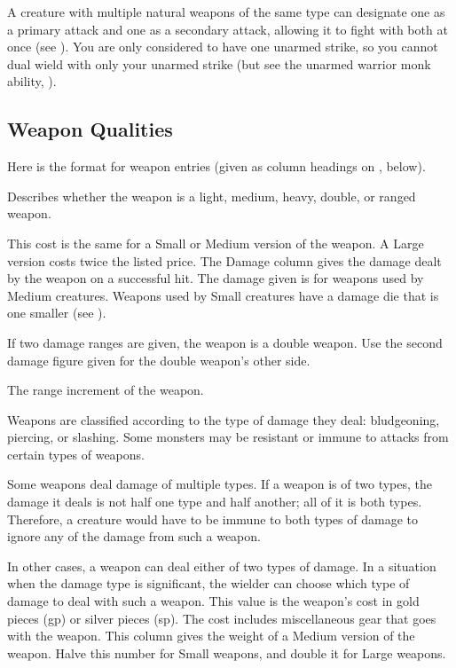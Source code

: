         A creature with multiple natural weapons of the same type can designate one as a primary attack and one as a secondary attack, allowing it to fight with both at once (see ). You are only considered to have one unarmed strike, so you cannot dual wield with only your unarmed strike (but see the unarmed warrior monk ability, ).

    \subsection{Weapon Qualities}
        Here is the format for weapon entries (given as column headings on , below).

         Describes whether the weapon is a light, medium, heavy, double, or ranged weapon.

        \par This cost is the same for a Small or Medium version of the weapon. A Large version costs twice the listed price.
         The Damage column gives the damage dealt by the weapon on a successful hit. The damage given is for weapons used by Medium creatures. Weapons used by Small creatures have a damage die that is one  smaller (see ).

        If two damage ranges are given, the weapon is a double weapon. Use the second damage figure given for the double weapon's other side.

         The range increment of the weapon.

         Weapons are classified according to the type of damage they deal: bludgeoning, piercing, or slashing. Some monsters may be resistant or immune to attacks from certain types of weapons.

        Some weapons deal damage of multiple types. If a weapon is of two types, the damage it deals is not half one type and half another; all of it is both types. Therefore, a creature would have to be immune to both types of damage to ignore any of the damage from such a weapon.

        In other cases, a weapon can deal either of two types of damage. In a situation when the damage type is significant, the wielder can choose which type of damage to deal with such a weapon.
         This value is the weapon's cost in gold pieces (gp) or silver pieces (sp). The cost includes miscellaneous gear that goes with the weapon.
         This column gives the weight of a Medium version of
        the weapon. Halve this number for Small weapons, and double it for Large weapons.

